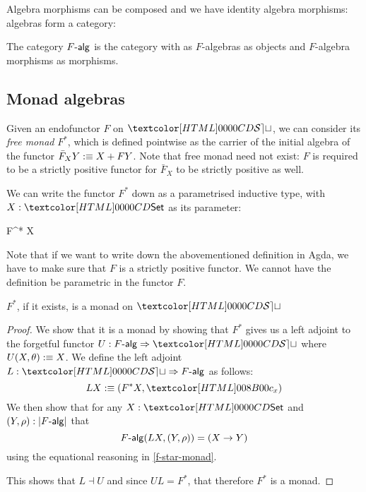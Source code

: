 Algebra morphisms can be composed and we have identity algebra
morphisms: algebras form a category:

\begin{definition}
  The category $\algcat{F}$ is the category with as $F$-algebras as
  objects and $F$-algebra morphisms as morphisms.
\end{definition}

\subsection{Monad algebras}

Given an endofunctor $F$ on $\SET$, we can consider its \emph{free
  monad} $F^*$, which is defined pointwise as the carrier of the
initial algebra of the functor $\bar{F}_X Y :\equiv X + FY$. Note that
free monad need not exist: $F$ is required to be a strictly positive
functor for $\bar{F}_X$ to be strictly positive as well. 

We can write the functor $F^*$ down as a parametrised inductive type,
with $X : \Set$ as its parameter:
%
\begin{datatype}{F^* X}{\Set}
   \\
\end{datatype}
%
Note that if we want to write down the abovementioned definition in
Agda, we have to make sure that $F$ is a strictly positive functor. We
cannot have the definition be parametric in the functor $F$.

\begin{proposition}
  \label{free-monad-thm}
  $F^*$, if it exists, is a monad on $\SET$
\end{proposition}

\begin{proof}
  We show that it is a monad by showing that $F^*$ gives us a left
  adjoint to the forgetful functor $U : \Func{\algcat{F}}{\SET}$ where
  $U (X , \theta) :\equiv X$. We define the left adjoint
  $L : \Func{\SET}{\algcat{F}}$ as follows:
  $$
  L X \ddefeq (F^* X , \Fstarc_x)
  $$
  We then show that for any $X : \Set$ and $(Y,\rho) : | \algcat{F} |$ that
  $$
  \algcat{F}(L X , (Y,\rho)) = (X \to Y)
  $$
  using the equational reasoning in \cref{f-star-monad}.

  This shows that $L \dashv U$ and since $UL = F^*$, that therefore
  $F^*$ is a monad.
\end{proof}


